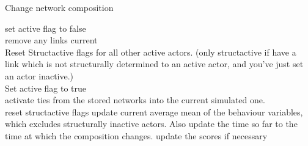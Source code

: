 \documentclass[12pt,a4paper]{article}
\makeatletter
\renewcommand{\=}{\,=\,}
\newcommand{\+}{\,+\,}
\renewcommand{\subsection}{\@startsection{subsection}{2}
                {0pt}{0.7\baselineskip}{0.3\baselineskip}
                {\sffamily} }
\makeatother
\begin{document}
\subsection{Change network composition}
\label{sec:cc}
\begin{algorithmic}
\STATE set active flag  to false\\
 remove any links current\\
Reset Structactive flags for all other active
  actors. (only structactive if have a link which is not structurally
  determined to an active actor, and you've just set an actor
  inactive.)\\
\STATE Set active flag to true\\
activate ties from the stored networks into
  the current simulated one.\\
 reset structactive flags
\ENDIF
\STATE update current average mean of the behaviour variables, which excludes
structurally inactive actors. Also update the time so far to the time at which
the composition changes.
\STATE update the scores if necessary
\end{algorithmic}
\end{document}
